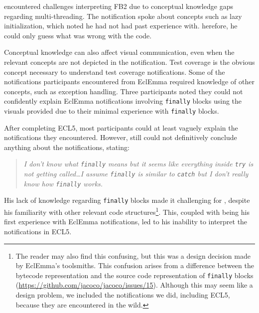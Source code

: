  encountered challenges interpreting FB2 due to conceptual knowledge gaps regarding multi-threading. 
The notification spoke about concepts such as lazy initialization, which  noted he had not had past experience with. 
herefore, he could only guess what was wrong with the code.

Conceptual knowledge can also affect visual communication, even when the relevant concepts are not depicted in the notification. Test coverage is the obvious concept necessary to understand test coverage notifications. 
Some of the notifications participants encountered from EclEmma required knowledge of other concepts, such as exception handling. 
Three participants noted they could not confidently explain EclEmma notifications involving \texttt{finally} blocks using the visuals provided due to their minimal experience with \texttt{finally} blocks.

After completing ECL5, most participants could at least vaguely explain the notifications they encountered. 
However,  still could not definitively conclude anything about the notifications, stating: 

\begin{quote}
	\textit{I don't know what \texttt{finally} means but it seems like everything inside \texttt{try} 
	is not getting called\ldots I assume \texttt{finally} is similar to \texttt{catch} 
	but I don't really know how \texttt{finally} works.}
\end{quote}

\noindent
His lack of knowledge regarding \texttt{finally} blocks made it challenging for , 
despite his familiarity with other relevant code structures\footnote{The reader may also find this confusing, but this was a design decision made by EclEmma's toolsmiths. This confusion arises from a difference between the bytecode representation and the source code representation of \texttt{finally} blocks (\url{https://github.com/jacoco/jacoco/issues/15}). Although this may seem like a design problem, we included the notifications we did, including ECL5, because they are encountered in the wild.}. 
This, coupled with being his first experience with EclEmma notifications, led to his inability to interpret the notifications in ECL5.

